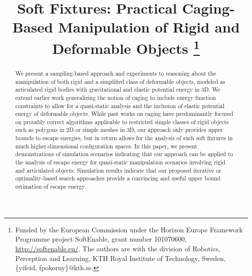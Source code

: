 \documentclass[conference]{IEEEtran}
\begin{document}
	
	\title{Soft Fixtures: Practical Caging-Based Manipulation of Rigid and Deformable Objects
		\thanks{Funded by the European Commission under the Horizon Europe Framework Programme project SoftEnable, grant number 101070600, \url{http://softenable.eu/}.
			The authors are with the division of Robotics, Perception and Learning,
			KTH Royal Institute of Technology, Sweden, \{yifeid, fpokorny\}@kth.se.}
	}
	
	\author{
	}
	
	\maketitle
	
	\begin{abstract}
		We present a sampling-based approach and experiments to reasoning about the manipulation of both rigid and a simplified class of deformable objects, modeled as articulated rigid bodies with gravitational and elastic potential energy in 3D. We extend earlier work generalizing the notion of caging to include energy function constraints to allow for a quasi-static analysis and the inclusion of elastic potential energy of deformable objects. While past works on caging have predominantly focused on provably correct algorithms applicable to restricted simple classes of rigid objects such as polygons in 2D or simple meshes in 3D, our approach only provides upper bounds to escape energies, but in return allows for the analysis of such soft fixtures in much higher-dimensional configuration spaces. In this paper, we present demonstrations of simulation scenarios indicating that our approach can be applied to the analysis of escape energy for quasi-static manipulation scenarios involving rigid and articulated objects. Simulation results indicate that our proposed iterative or optimality-based search approaches provide a convincing and useful upper bound estimation of escape energy.
	\end{abstract}
\end{document}
